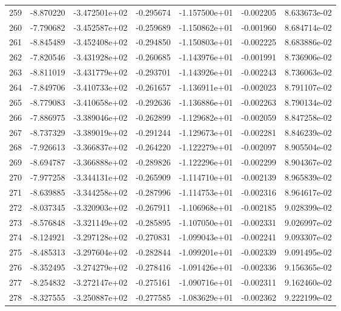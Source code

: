 \begin{tabular}{rrrrrrr}
 259 &  -8.870220 & -3.472501e+02 & -0.295674 & -1.157500e+01 &  -0.002205 &  8.633673e-02 \\
 260 &  -7.790682 & -3.452587e+02 & -0.259689 & -1.150862e+01 &  -0.001960 &  8.684714e-02 \\
 261 &  -8.845489 & -3.452408e+02 & -0.294850 & -1.150803e+01 &  -0.002225 &  8.683886e-02 \\
 262 &  -7.820546 & -3.431928e+02 & -0.260685 & -1.143976e+01 &  -0.001991 &  8.736906e-02 \\
 263 &  -8.811019 & -3.431779e+02 & -0.293701 & -1.143926e+01 &  -0.002243 &  8.736063e-02 \\
 264 &  -7.849706 & -3.410733e+02 & -0.261657 & -1.136911e+01 &  -0.002023 &  8.791107e-02 \\
 265 &  -8.779083 & -3.410658e+02 & -0.292636 & -1.136886e+01 &  -0.002263 &  8.790134e-02 \\
 266 &  -7.886975 & -3.389046e+02 & -0.262899 & -1.129682e+01 &  -0.002059 &  8.847258e-02 \\
 267 &  -8.737329 & -3.389019e+02 & -0.291244 & -1.129673e+01 &  -0.002281 &  8.846239e-02 \\
 268 &  -7.926613 & -3.366837e+02 & -0.264220 & -1.122279e+01 &  -0.002097 &  8.905504e-02 \\
 269 &  -8.694787 & -3.366888e+02 & -0.289826 & -1.122296e+01 &  -0.002299 &  8.904367e-02 \\
 270 &  -7.977258 & -3.344131e+02 & -0.265909 & -1.114710e+01 &  -0.002139 &  8.965839e-02 \\
 271 &  -8.639885 & -3.344258e+02 & -0.287996 & -1.114753e+01 &  -0.002316 &  8.964617e-02 \\
 272 &  -8.037345 & -3.320903e+02 & -0.267911 & -1.106968e+01 &  -0.002185 &  9.028399e-02 \\
 273 &  -8.576848 & -3.321149e+02 & -0.285895 & -1.107050e+01 &  -0.002331 &  9.026997e-02 \\
 274 &  -8.124921 & -3.297128e+02 & -0.270831 & -1.099043e+01 &  -0.002241 &  9.093307e-02 \\
 275 &  -8.485313 & -3.297604e+02 & -0.282844 & -1.099201e+01 &  -0.002339 &  9.091495e-02 \\
 276 &  -8.352495 & -3.274279e+02 & -0.278416 & -1.091426e+01 &  -0.002336 &  9.156365e-02 \\
 277 &  -8.254832 & -3.272147e+02 & -0.275161 & -1.090716e+01 &  -0.002311 &  9.162460e-02 \\
 278 &  -8.327555 & -3.250887e+02 & -0.277585 & -1.083629e+01 &  -0.002362 &  9.222199e-02 \\

\end{tabular}
